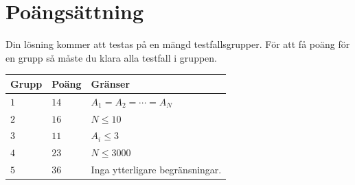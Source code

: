 \section*{Poängsättning}
Din lösning kommer att testas på en mängd testfallsgrupper.
För att få poäng för en grupp så måste du klara alla testfall i gruppen.

\noindent
\begin{tabular}{| l | l | p{12cm} |}
  \hline
  \textbf{Grupp} & \textbf{Poäng} & \textbf{Gränser} \\ \hline
  $1$   & $14$       & $A_1 = A_2 = \cdots = A_N$\\ \hline
  $2$   & $16$       & $N \leq 10$  \\ \hline
  $3$   & $11$       & $A_i \leq 3$ \\ \hline
  $4$   & $23$       & $N \leq 3000$ \\ \hline
  $5$   & $36$       & Inga ytterligare begränsningar. \\ \hline
\end{tabular}
